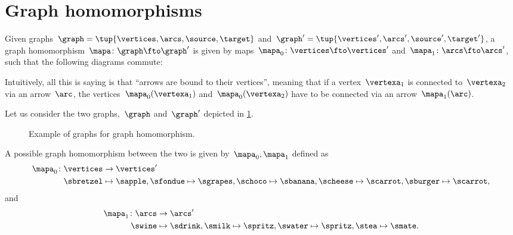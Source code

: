 
\section{Graph homomorphisms}
\begin{definition}
    \label{def:graph_homom}
    Given graphs~$\graph=\tup{\vertices,\arcs,\source,\target}$ and~$\graph'=\tup{\vertices',\arcs',\source',\target'}$, a graph homomorphism~$\mapa \colon \graph \fto \graph'$ is given by maps~$\mapa_0\colon \vertices \fto \vertices'$ and~$\mapa_1\colon \arcs \fto \arcs'$, such that the following diagrams commute:
    \begin{center}
    \end{center}
\end{definition}
\begin{remark}
    Intuitively, all this is saying is that ``arrows are bound to their vertices'', meaning that if a vertex~$\vertexa_1$ is connected to~$\vertexa_2$ via an arrow~$\arc$, the vertices~$\mapa_0(\vertexa_1)$ and~$\mapa_0(\vertexa_2)$ have to be connected via an arrow~$\mapa_1(\arc)$.
\end{remark}

\begin{example}
    \label{exa:homomorphism_graph_positive}
    Let us consider the two graphs,~$\graph$ and~$\graph'$ depicted in \cref{fig:ex_graph_homom}.
    \begin{figure}[h]
        \centering
        \caption{Example of graphs for graph homomorphism.}
        \label{fig:ex_graph_homom}
    \end{figure}

    A possible graph homomorphism between the two is given by~$\mapa_0,\mapa_1$ defined as
    \begin{equation*}
        \begin{aligned}
            \mapa_0\colon \vertices & \to \vertices'   \\
            \sbretzel               & \mapsto \sapple,
            \sfondue\mapsto \sgrapes,
            \schoco\mapsto \sbanana,
            \scheese\mapsto \scarrot,
            \sburger\mapsto \scarrot,
        \end{aligned}
    \end{equation*}
    and
    \begin{equation*}
        \begin{aligned}
            \mapa_1\colon \arcs & \to \arcs'       \\
            \swine              & \mapsto \sdrink,
            \smilk\mapsto \spritz,
            \swater\mapsto \spritz,
            \stea\mapsto \smate.
        \end{aligned}
    \end{equation*}
\end{example}

